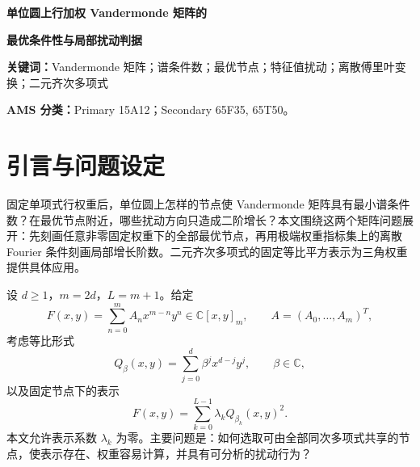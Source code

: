 \documentclass[UTF8,a4paper,zihao=-4,fontset=windows]{ctexart}
\theoremstyle{chinese}
\numberwithin{equation}{section}
\newcommand{\C}{\mathbb C}
\begin{document}
\thispagestyle{plain}
\begin{center}
{\LARGE\bfseries 单位圆上行加权 Vandermonde 矩阵的\par}
\vspace{.6em}
{\LARGE\bfseries 最优条件性与局部扰动判据\par}
\end{center}
\begin{abstract}
本文研究固定非零单项式行权重下单位圆 Vandermonde 矩阵的最优谱条件数及局部节点扰动。最优值等于最大与最小权重模之比，全部取等节点恰为旋转和排列后的等间距单位根。在固定维数的最优配置附近，极端权重指标集上的 Fourier 消失条件刻画了一阶条件数增长消失的方向。权重模不全相等时，每个非旋转平坦方向均具有严格二阶增长，其系数由两个有效谱矩阵给出，并满足显式正下界。联合优化耦合谱约束可得带权 Fourier 矩上界。对于二元齐次多项式等比平方表示对应的三角权重，平坦判据简化为第一离散 Fourier 系数消失，第二谐波方向的二阶系数具有闭式表达。高精度实验核验局部理论，并将基于 Fourier 变换的计算与预计算稠密变换、缓存 LU 及每次重新分解的 LU 进行比较。
\end{abstract}
\noindent\textbf{关键词：}Vandermonde 矩阵；谱条件数；最优节点；特征值扰动；离散傅里叶变换；二元齐次多项式

\noindent\textbf{AMS 分类：}Primary 15A12；Secondary 65F35, 65T50。

\section{引言与问题设定}
固定单项式行权重后，单位圆上怎样的节点使 Vandermonde 矩阵具有最小谱条件数？在最优节点附近，哪些扰动方向只造成二阶增长？本文围绕这两个矩阵问题展开：先刻画任意非零固定权重下的全部最优节点，再用极端权重指标集上的离散 Fourier 条件刻画局部增长阶数。二元齐次多项式的固定等比平方表示为三角权重提供具体应用。

设 $d\ge1$，$m=2d$，$L=m+1$。给定
\begin{equation}\label{eq:F}
F(x,y)=\sum_{n=0}^{m}A_nx^{m-n}y^n\in\C[x,y]_m,
\qquad A=(A_0,\ldots,A_m)^T,
\end{equation}
考虑等比形式
\begin{equation}\label{eq:Q}
Q_\beta(x,y)=\sum_{j=0}^{d}\beta^j x^{d-j}y^j,
\qquad \beta\in\C,
\end{equation}
以及固定节点下的表示
\begin{equation}\label{eq:representation}
F(x,y)=\sum_{k=0}^{L-1}\lambda_kQ_{\beta_k}(x,y)^2.
\end{equation}
本文允许表示系数 $\lambda_k$ 为零。主要问题是：如何选取可由全部同次多项式共享的节点，使表示存在、权重容易计算，并具有可分析的扰动行为？
\end{document}
